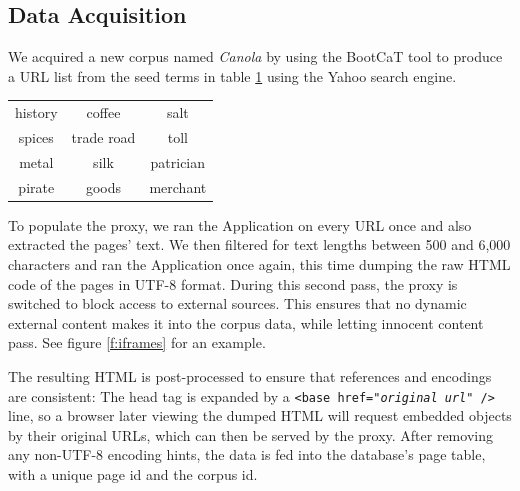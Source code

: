 \subsection{Data Acquisition\label{datagather}}

We acquired a new corpus named \textit{Canola} by using the BootCaT \cite{bootcat} tool to produce a URL list from the seed terms in table \ref{t:seed} using the Yahoo search engine. 

\begin{table}
\centering
{}
\begin{tabular}[h]{ccc}
        history
&        coffee 
&        salt \\
        spices 
&        trade road
&        toll \\
        metal
&        silk 
&        patrician \\
        pirate 
&        goods
&        merchant 
\end{tabular}
\label{t:seed}
\end{table}


To populate the proxy, we ran the Application on every URL once and also extracted the pages' text.
We then filtered for text lengths between 500 and 6,000 characters and ran the Application once again, this time dumping the raw HTML code of the pages in UTF-8 format.
During this second pass, the proxy is switched to block access to external sources.
This ensures that no dynamic external content makes it into the corpus data, while letting innocent content pass.
See figure \ref{f:iframes} for an example.


The resulting HTML is post-processed to ensure that references and encodings are consistent:
The head tag is expanded by a \texttt{<base href="\textit{original url}" />} line, so a browser later viewing the dumped HTML will request embedded objects by their original URLs, which can then be served by the proxy.
After removing any non-UTF-8 encoding hints, the data is fed into the database's page table, with a unique page id and the corpus id.

